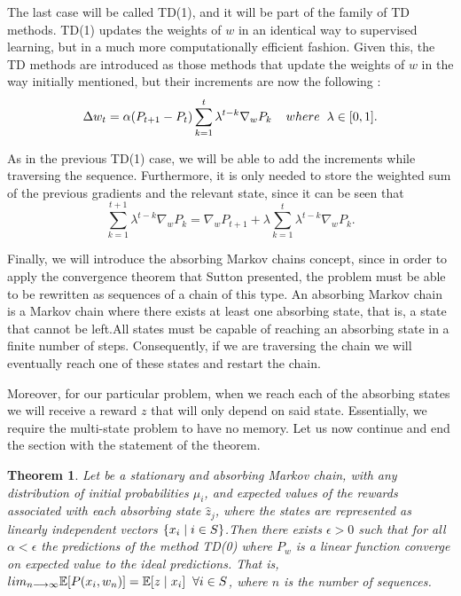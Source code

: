 \documentclass[12pt]{article}
\newtheorem{theorem}{Theorem}[section]
\numberwithin{equation}{section}
\begin{document}
The last case will be called TD(1), and it will be part of the family of TD methods. TD(1) updates the weights of $w$ in an identical  way to supervised learning, but in a  much more computationally efficient fashion. Given this, the TD methods are introduced as those methods that update the weights of $w$ in the way initially mentioned, but their increments are now the following :
\begin{equation}
    \Delta w_t= \alpha (P_{t+1}-P_{t}) \sum_{k=1}^{t} \lambda^{t-k} \nabla_w P_k  \hspace{4mm} where  \hspace{2mm} \lambda \in [0,1].
\end{equation}

As in the previous TD(1) case, we will be able to add the increments while traversing the sequence. Furthermore, it is only needed to store the weighted sum of the previous gradients and the relevant state, since it can be seen that
$$\sum_{k=1}^{t+1} \lambda^{t-k} \nabla_w P_k= \nabla_w P_{t+1}+\lambda \sum_{k=1}^{t} \lambda^{t-k} \nabla_w P_k.$$

  

Finally, we will introduce the absorbing Markov chains concept, since in order to apply the convergence theorem that Sutton presented, the problem must be able to be rewritten as sequences of a chain of this type. An absorbing Markov chain is 
 a Markov  chain where there exists at least one absorbing state, that is, a state that cannot be left.All states must be capable of reaching  an absorbing state in a finite number of steps. Consequently, if we are traversing the chain we will eventually reach one of these states and restart the chain.



Moreover, for our particular problem, when we reach each of the absorbing states we will receive a reward $z$ that will only depend on said state. Essentially, we require the multi-state problem to have no memory. Let us now continue and end the section with the statement of the theorem.

\begin{theorem}


Let be a stationary and absorbing Markov chain, with any distribution of initial probabilities $\mu_i$, and  expected values of the rewards associated with each absorbing state $\hat{z}_j$, where  the states are represented as linearly independent vectors $\{ x_i \hspace{1mm}| \hspace{1mm}i\in S\}$.Then there exists  $\epsilon >0$ such that for all $\alpha<\epsilon$ the predictions of the method TD(0) where $P_w$ is a linear function converge on expected value to the ideal predictions. That is, $lim_{n\longrightarrow \infty} \mathbb{E}[P(x_i,w_n)] =\mathbb{E}[z \hspace{1mm} | \hspace{1mm}x_i] \hspace{2mm} \forall i \in S$, where $n$ is the number of sequences.
\end{theorem}
\end{document}
